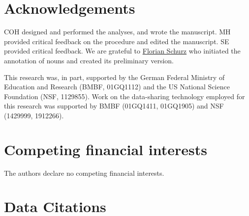 \documentclass[english]{article}
\begin{document}
\section*{Acknowledgements}

%
COH designed and performed the analyses, and wrote the manuscript.
%
MH provided critical feedback on the procedure and edited the manuscript.
%
SE provided critical feedback.
%
We are grateful to \href{www.florianschurz.de}{Florian Schurz} who initiated the
annotation of nouns and created its preliminary version.%

This research was, in part, supported by the German Federal Ministry of
Education and Research (BMBF, 01GQ1112) and the US National Science Foundation
(NSF, 1129855). Work on the data-sharing technology employed for this research
was supported by BMBF (01GQ1411, 01GQ1905) and NSF (1429999, 1912266).

\section*{Competing financial interests}
The authors declare no competing financial interests.


{\small
}

%
%

\section{Data Citations}
\end{document}
